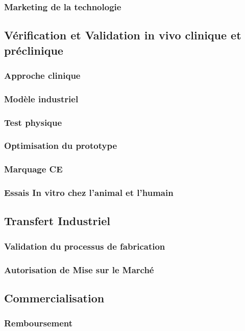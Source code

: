 \documentclass[a4paper,11pt]{article}
\begin{document}
\begin{sloppypar}
\subsubsection{Marketing de la technologie}

\subsection{Vérification et Validation in vivo clinique et préclinique}
\subsubsection{Approche clinique}
\subsubsection{Modèle industriel}
\subsubsection{Test physique}
\subsubsection{Optimisation du prototype}
\subsubsection{Marquage CE}
\subsubsection{Essais In vitro chez l'animal et l'humain}

\subsection{Transfert Industriel}
\subsubsection{Validation du processus de fabrication}
\subsubsection{Autorisation de Mise sur le Marché}

\subsection{Commercialisation}
\subsubsection{Remboursement}

\end{sloppypar}
\end{document}
